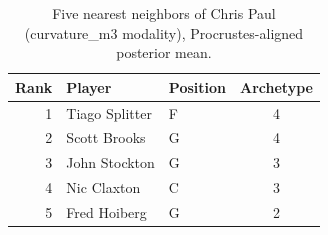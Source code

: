 \begin{table}[htbp]
  \centering\small
  \begin{tabular}{rllc}
    \toprule
    Rank & Player & Position & Archetype \\
    \midrule
    1 & Tiago Splitter & F & 4 \\
    2 & Scott Brooks & G & 4 \\
    3 & John Stockton & G & 3 \\
    4 & Nic Claxton & C & 3 \\
    5 & Fred Hoiberg & G & 2 \\
    \bottomrule
  \end{tabular}
  \caption{Five nearest neighbors of Chris Paul (curvature_m3 modality), Procrustes-aligned posterior mean.}
  \label{tab:Chris_Paul_neighbors_curvature_m3}
\end{table}

